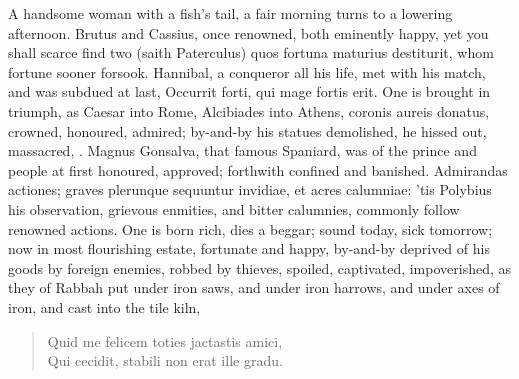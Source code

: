 {A handsome woman with a fish's tail, a fair morning turns to a lowering afternoon. Brutus and Cassius, once
renowned, both eminently happy, yet you shall scarce find two (saith
Paterculus) quos fortuna maturius destiturit, whom fortune sooner
forsook. Hannibal, a conqueror all his life, met with his match, and
was subdued at last, Occurrit forti, qui mage fortis erit. One is
brought in triumph, as Caesar into Rome, Alcibiades into Athens,
coronis aureis donatus, crowned, honoured, admired; by-and-by his
statues demolished, he hissed out, massacred, \etc{}. Magnus
Gonsalva, that famous Spaniard, was of the prince and people at first
honoured, approved; forthwith confined and banished. Admirandas
actiones; graves plerunque sequuntur invidiae, et acres calumniae: 'tis
Polybius his observation, grievous enmities, and bitter calumnies,
commonly follow renowned actions. One is born rich, dies a beggar;
sound today, sick tomorrow; now in most flourishing estate, fortunate
and happy, by-and-by deprived of his goods by foreign enemies, robbed
by thieves, spoiled, captivated, impoverished, as they of Rabbah
put under iron saws, and under iron harrows, and under axes of iron,
and cast into the tile kiln,

\begin{verse}
\textlatin{Quid me felicem toties jactastis amici},\\
\textlatin{Qui cecidit, stabili non erat ille gradu.}
\end{verse}

}
